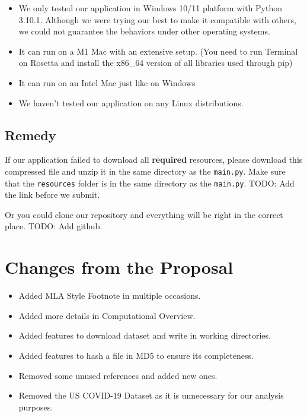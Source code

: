 \documentclass[fontsize=11pt]{article}
\begin{document}
    \begin{itemize}
        \item We only tested our application in Windows 10/11 platform with Python 3.10.1. Although we were trying our best to make it compatible with others, we could not guarantee the behaviors under other operating systems.
        \item It can run on a M1 Mac with an extensive setup. (You need to run Terminal on Rosetta and install the x86\_64 version of all libraries used through pip)
        \item It can run on an Intel Mac just like on Windows
        \item We haven't tested our application on any Linux distributions.
    \end{itemize}

    \subsection{Remedy}

    If our application failed to download all \textbf{required} resources, please download this compressed file and unzip it in the same directory as the \verb|main.py|. Make sure that the \verb|resources| folder is in the same directory as the \verb|main.py|. TODO: Add the link before we submit.

    Or you could clone our repository and everything will be right in the correct place. TODO: Add github.

    \section{Changes from the Proposal}

    \begin{itemize}
        \item Added MLA Style Footnote in multiple occasions.
        \item Added more details in Computational Overview.
        \item Added features to download dataset and write in working directories.
        \item Added features to hash a file in MD5 to ensure its completeness.
        \item Removed some unused references and added new ones.
        \item Removed the US COVID-19 Dataset as it is unnecessary for our analysis purposes.
    \end{itemize}
\end{document}
